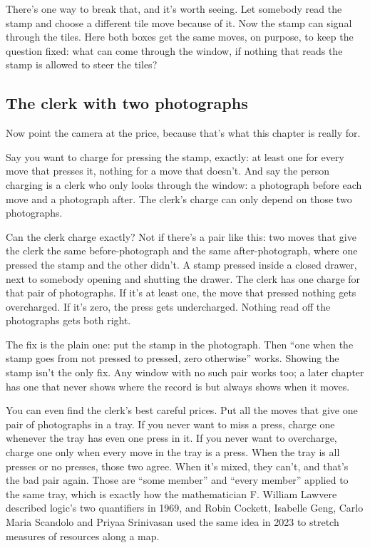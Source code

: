\documentclass[11pt,twoside]{article}
\theoremstyle{thielethm}
\theoremstyle{thieledef}
\theoremstyle{thieledef}
\theoremstyle{thieledef}
\theoremstyle{thielethm}
\theoremstyle{thieleobs}
\theoremstyle{thielethm}
\begin{document}
There's one way to break that, and it's worth seeing. Let somebody read the stamp and choose a different tile move because of it. Now the stamp can signal through the tiles. Here both boxes get the same moves, on purpose, to keep the question fixed: what can come through the window, if nothing that reads the stamp is allowed to steer the tiles?

\subsection{The clerk with two photographs}

Now point the camera at the price, because that's what this chapter is really for.

Say you want to charge for pressing the stamp, exactly: at least one for every move that presses it, nothing for a move that doesn't. And say the person charging is a clerk who only looks through the window: a photograph before each move and a photograph after. The clerk's charge can only depend on those two photographs.

Can the clerk charge exactly? Not if there's a pair like this: two moves that give the clerk the same before-photograph and the same after-photograph, where one pressed the stamp and the other didn't. A stamp pressed inside a closed drawer, next to somebody opening and shutting the drawer. The clerk has one charge for that pair of photographs. If it's at least one, the move that pressed nothing gets overcharged. If it's zero, the press gets undercharged. Nothing read off the photographs gets both right.

The fix is the plain one: put the stamp in the photograph. Then ``one when the stamp goes from not pressed to pressed, zero otherwise'' works. Showing the stamp isn't the only fix. Any window with no such pair works too; a later chapter has one that never shows where the record is but always shows when it moves.

You can even find the clerk's best careful prices. Put all the moves that give one pair of photographs in a tray. If you never want to miss a press, charge one whenever the tray has even one press in it. If you never want to overcharge, charge one only when every move in the tray is a press. When the tray is all presses or no presses, those two agree. When it's mixed, they can't, and that's the bad pair again. Those are ``some member'' and ``every member'' applied to the same tray, which is exactly how the mathematician F. William Lawvere described logic's two quantifiers in 1969, and Robin Cockett, Isabelle Geng, Carlo Maria Scandolo and Priyaa Srinivasan used the same idea in 2023 to stretch measures of resources along a map.
\end{document}

